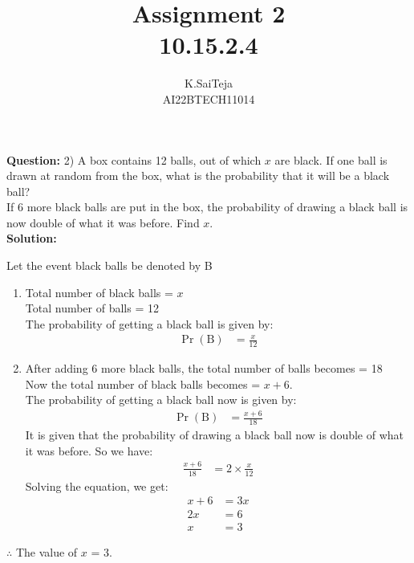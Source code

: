 \documentclass[journal,12pt,two column]{IEEEtran}
\title{Assignment 2 \\ 10.15.2.4}
\author{K.SaiTeja \\ AI22BTECH11014}
\providecommand{\pr}[1]{\ensuremath{\Pr\left(#1\right)}}
\newcommand{\question}{\noindent \textbf{Question: }}
\newcommand{\solution}{\noindent \textbf{Solution: }}
\begin{document}
\maketitle
\question 2)
A box contains 12 balls, out of which $x$ are black. If one ball is drawn at random from the box, what is the probability that it will be a black ball?\\ If 6 more black balls are put in the box, the probability of drawing a black ball is now double of what it was before. Find $x$.\\
\solution 
\begin{center}
Let the event black balls be denoted by \text B
\end{center}
\begin{enumerate}
  
    \item Total number of black balls = $x$\\
          Total number of balls = 12 \\
   The probability of getting a black ball is given by:
\begin{align}   
   \pr{\text{B}} &= \frac{x}{12} 
\end{align}  
  \item After adding 6 more black balls, the total number of balls becomes = 18 \\  
    Now the total number of black balls becomes = $x+6$.  \\
    The probability of getting a black ball now is given by:
\begin{align}  
  \pr{\text{B}} &= \frac{x+6}{18} 
\end{align}  
    It is given that the probability of drawing a black ball now is double of what it was before. So we have:    
\begin{align}
  \frac{x+6}{18} &= 2 \times \frac{x}{12}
\end{align}  
   Solving the equation, we get:
\begin{align}   
 x + 6 &= 3x \\
  2x &= 6 \\
  x &= 3
\end{align}
 
\end{enumerate}
\begin{center}
$\therefore$ The value of $x$ = 3.
\end{center}
\end{document}
